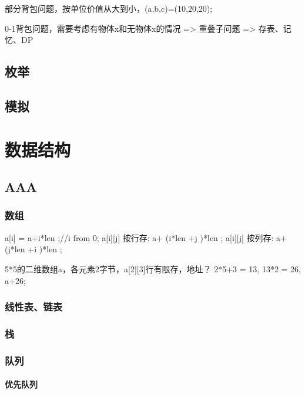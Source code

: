 \documentclass[UTF8]{../computerUniverse}
\begin{document}
部分背包问题，按单位价值从大到小，(a,b,c)=(10,20,20);

0-1背包问题，需要考虑有物体x和无物体x的情况 => 重叠子问题 => 存表、记忆、DP


\section{枚举}

\section{模拟}





\chapter{数据结构}

\section{AAA}


\subsection{数组}
 a[i] = a+i*len ;//i from 0;
 a[i][j]  按行存: a+ (i*len +j )*len ;
 a[i][j]  按列存: a+ (j*len +i )*len ;

 5*5的二维数组a，各元素2字节，a[2][3]行有限存，地址？
 2*5+3 = 13, 13*2 = 26, a+26;



 

\subsection{线性表、链表}



\subsection{栈}


\subsection{队列}

\subsubsection{优先队列}
\end{document}
